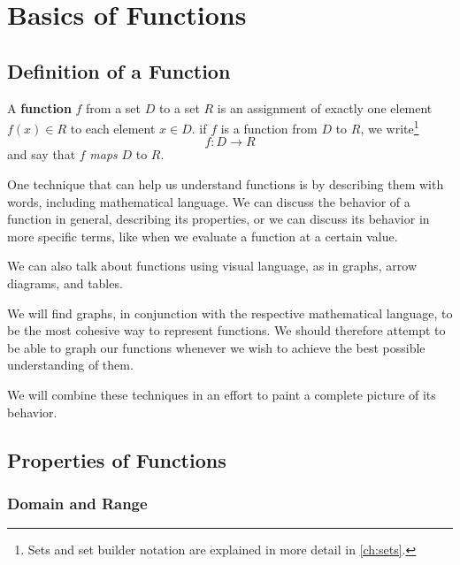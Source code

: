 \chapter{Basics of Functions}
\section{Definition of a Function}

  A \textbf{function} \(f\) from a set \(D\) to a set \(R\) is an assignment of exactly one element \(f(x) \in R\) to each element \(x \in D\).
  if $f$ is a function from $D$ to $R$, we write\footnote{Sets and set builder notation are explained in more detail in \ref{ch:sets}.}
  \[f:D \to R\]
  and say that $f$ \emph{maps} $D$ to $R$.

  One technique that can help us understand functions is by describing them with words,
including mathematical language.
We can discuss the behavior of a function in general,
describing its properties, or we can discuss its behavior in more specific terms,
like when we evaluate a function at a certain value.

We can also talk about functions using visual language, as in graphs, arrow diagrams, and tables.

We will find graphs, in conjunction with the respective mathematical language, to be the most cohesive way to represent functions.
We should therefore attempt to be able to graph our functions whenever we wish to achieve the best possible understanding of them.

We will combine these techniques in an effort to paint a complete picture of its behavior.

\section{Properties of Functions}


\subsection{Domain and Range}

